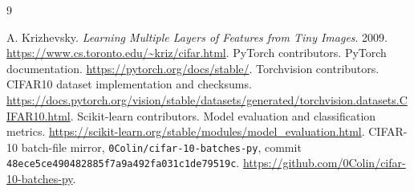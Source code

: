 \documentclass[11pt,a4paper]{article}
\begin{document}
\begin{thebibliography}{9}\raggedright
{} A. Krizhevsky. \emph{Learning Multiple Layers of Features from Tiny Images}. 2009.
\url{https://www.cs.toronto.edu/~kriz/cifar.html}.
 PyTorch contributors. PyTorch documentation.
\url{https://pytorch.org/docs/stable/}.
 Torchvision contributors. CIFAR10 dataset implementation and checksums.
\url{https://docs.pytorch.org/vision/stable/datasets/generated/torchvision.datasets.CIFAR10.html}.
 Scikit-learn contributors. Model evaluation and classification metrics.
\url{https://scikit-learn.org/stable/modules/model_evaluation.html}.
 CIFAR-10 batch-file mirror, \texttt{0Colin/cifar-10-batches-py}, commit
\texttt{48ece5ce490482885f7a9a492fa031c1de79519c}.
\url{https://github.com/0Colin/cifar-10-batches-py}.
\end{thebibliography}
\end{document}
